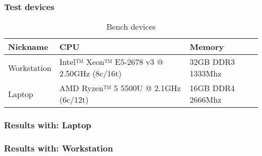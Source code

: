 \subsubsection{Test devices}

\begin{table}[H]
	\centering
	\begin{tabular}{ | m{} | m{} | m{} | }
		\hline
		\textbf{Nickname} & \textbf{CPU} & \textbf{Memory} \\
		\hline \hline
		Workstation & Intel™ Xeon™ E5-2678 v3 @ 2.50GHz (8c/16t) & 32GB DDR3 1333Mhz \\ 
		\hline
		Laptop & AMD Ryzen™ 5 5500U @ 2.1GHz (6c/12t) & 16GB DDR4 2666Mhz \\
		\hline
	\end{tabular}
	\caption{Bench devices}
	\label{tab:devices}
\end{table}

\subsubsection{Results with: Laptop}



\subsubsection{Results with: Workstation}

